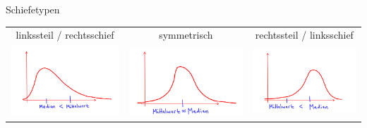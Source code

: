 \documentclass[t,11pt,aspectratio=169]{beamer}
\begin{document}
	
\begin{frame}
    Schiefetypen
	\begin{center}
		\begin{tabular}{ccc}
			linkssteil / rechtsschief & symmetrisch & rechtssteil / linksschief  \\
			\includegraphics[scale=0.15]{1.png} & \includegraphics[scale=0.15]{2.png} & \includegraphics[scale=0.15]{3.png}  
		\end{tabular} 
	\end{center}
\end{frame}
\end{document}
